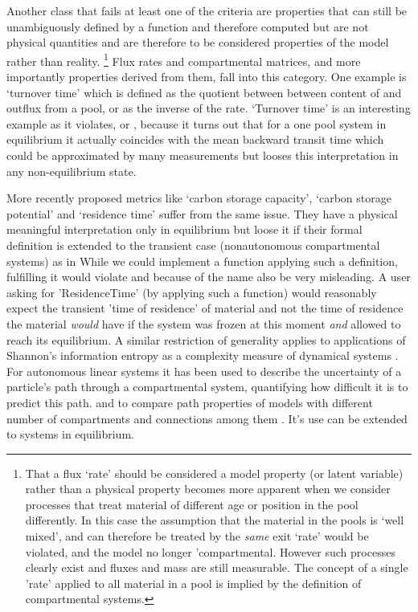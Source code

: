 Another class that fails at least one of the criteria
are properties that can still be unambiguously defined by a function and
therefore computed but are not physical quantities and are therefore to be
considered properties of the model rather than reality. 
\footnote{
  That a flux `rate' should be considered a model property (or latent variable)
  rather than a physical property becomes more apparent when we consider
  processes that treat material of different age or position in the pool
  differently.  In this case the assumption that the material in the pools is
  `well mixed', and can therefore be treated by the \emph{same} exit `rate'
  would be violated, and the model no longer 'compartmental.  However such
  processes clearly exist and fluxes and mass are still measurable.  The
  concept of a single 'rate' applied to all material in a pool is implied by
  the definition of compartmental systems.
} 
Flux rates and compartmental matrices, and more importantly properties derived from them, fall into  this category. 
One example is `turnover time' which is defined as the quotient between between content of and outflux from a pool, or as the inverse of the rate. 
`Turnover time' is an interesting example as it violates,  or , 
because it turns out that for a one pool system in equilibrium it actually coincides with the mean backward transit time
which could be approximated by many measurements but looses this interpretation in any non-equilibrium state.

More recently proposed metrics 
like `carbon storage capacity',  `carbon storage potential' and `residence time' suffer from the same issue.
They have a physical meaningful interpretation only in equilibrium 
but loose it if their formal definition is extended to the transient case (nonautonomous compartmental systems) as in \citep{Luo2017Biogeosciences}
While we could implement a function applying such a definition, fulfilling  it would violate  and because of the name also be very misleading. 
A user asking for  'ResidenceTime' (by applying such a function) would reasonably expect the transient 'time of residence' of material and not the time of residence the material  
\emph{would} have if the system was frozen at this moment \emph{and} allowed to reach its equilibrium.
A similar restriction of generality applies to applications of Shannon's information entropy as a complexity measure 
of dynamical systems \citep{Ebeling1998}. 
For 
autonomous linear systems it has 
been used to describe the uncertainty of a particle's path through a
compartmental system, quantifying how difficult it is to predict this path. 
and to compare path properties of models with different number of
compartments and connections among them \citep{Metzler2020}. 
It's use can be extended to systems in equilibrium.


